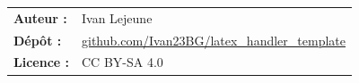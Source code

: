 \begin{titlepage}
    \vfill

    \raggedright
    \small
    \begin{tabular}{@{} l l @{}}
        \textbf{Auteur :} & Ivan Lejeune \\
        \textbf{Dépôt :} & \href{https://github.com/Ivan23BG/latex_handler_template}{\color{exocolor}github.com/Ivan23BG/latex\_handler\_template} \\ %
        \textbf{Licence :} & \color{fallbackcolor} CC BY-SA 4.0
    \end{tabular}

    \clearpage
\end{titlepage}
\pagecolor{bgcolor} %